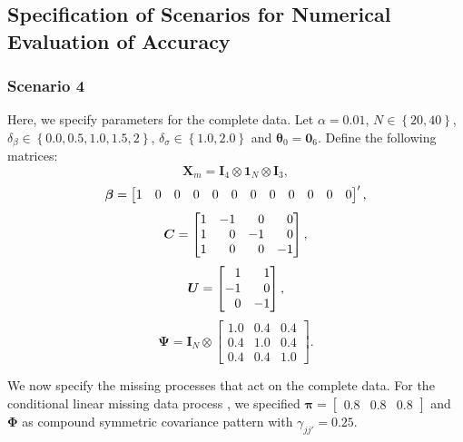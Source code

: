 \documentclass[11pt]{article}
\begin{document}
\subsection{Specification of Scenarios for Numerical Evaluation of Accuracy}
\label{hotdog}

\subsubsection{Scenario 4} 

Here, we specify parameters for the complete data. Let $\alpha=0.01$, $N\in\left\{20,40\right\}$, $\delta_{\beta}\in\left\{0.0,0.5,1.0,1.5,2\right\}$, $\delta_{\sigma}\in\left\{1.0,2.0\right\}$ and $\boldsymbol{\theta}_{0}=\boldsymbol{0}_{6}$. Define the following matrices:
\begin{equation}
\boldsymbol{X}_{m}=\boldsymbol{I}_{4}\otimes\boldsymbol{1}_{N}\otimes\boldsymbol{I}_{3},
\end{equation}
\begin{equation}
\boldsymbol{\beta}=
\setcounter{MaxMatrixCols}{12}\begin{bmatrix}
1&0&0&0&0&0&0&0&0&0&0&0
\end{bmatrix}\setcounter{MaxMatrixCols}{10}
',
\end{equation}
\begin{equation}
\boldsymbol{C}=
\begin{bmatrix}
\hfill 1&\hfill-1&\hfill 0&\hfill 0\\
\hfill 1&\hfill 0&\hfill-1&\hfill 0\\
\hfill 1&\hfill 0&\hfill 0&\hfill-1
\end{bmatrix}
,
\end{equation}
\begin{equation}
\boldsymbol{U}=
\begin{bmatrix}
\hfill 1&\hfill 1\\
\hfill-1&\hfill 0\\
\hfill 0&\hfill-1
\end{bmatrix},
\end{equation}
\begin{equation}
\boldsymbol{\Psi}=\boldsymbol{I}_{N}\otimes
\begin{bmatrix}
1.0&0.4&0.4\\
0.4&1.0&0.4\\
0.4&0.4&1.0
\end{bmatrix}.
\end{equation}

We now specify the missing processes that act on the complete data. For the conditional linear missing data process \cite{qaqish_family_2003}, we specified $\boldsymbol{\pi}=\begin{bmatrix}0.8&0.8&0.8\end{bmatrix}$ and $\boldsymbol{\Phi}$ as compound symmetric covariance pattern with $\gamma_{jj'}=0.25$.
\end{document}
